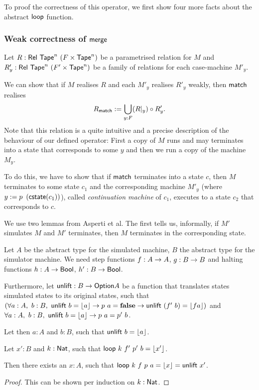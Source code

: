 \documentclass{psartcl}
\begin{document}
To proof the correctness of this operator, we first show four more facts about the abstract $\textsf{loop}$ function.

\subsubsection{Weak correctness of $\textsf{merge}$}

Let $R:\mathsf{Rel}~{\textsf{Tape}^{n}}~(F \times \textsf{Tape}^{n})$ be a parametrised relation for $M$ and $R'_y:\mathsf{Rel}~\textsf{Tape}^{n}~(F' \times \textsf{Tape}^{n})$ be a family
of relations for each case-machine $M'_y$.

We can show that if $M$ realises $R$ and each $M'_y$ realises $R'_y$ weakly, then $\textsf{match}$ realises
$$R_{\textsf{match}} := \bigcup_{y:F} (R |_{y}) \circ R'_y.$$
Note that this relation is a quite intuitive and a precise description of the behaviour of our defined operator:  First a copy of $M$ runs and may
terminates into a state that corresponds to some $y$ and then we run a copy of the machine $M_y$.

To do this, we have to show that if $\textsf{match}$ terminates into a state $c$, then $M$ terminates to some state $c_1$ and the corresponding machine
$M'_y$ (where $y := p~\left( \textsf{cstate}(c_1) \right)$), called \emph{continuation machine} of $c_1$, executes to a state $c_2$ that corresponds to
$c$.

We use two lemmas from Asperti et al.  The first tells us, informally, if $M'$ simulates $M$ and $M'$ terminates, then $M$ terminates in the
corresponding state.

\begin{lemma}
  \label{lem:loop-unlift}
  Let $A$ be the abstract type for the simulated machine, $B$ the abstract type for the simulator machine.
  We need step functions $f : A \rightarrow A$, $g : B \rightarrow B$ and halting functions $h : A \rightarrow \textsf{Bool}$, $h' : B \rightarrow \textsf{Bool}$.

  Furthermore, let $\textsf{unlift} : B \rightarrow \textsf{Option} A$ be a function that translates states simulated states to its original states, such that
  $(\forall a: A,~b: B,~\textsf{unlift}~b = \left\lfloor {a}\right\rfloor \rightarrow p~a = \mathbf{false} \rightarrow \textsf{unlift}~(f'~b) = \left\lfloor {f a}\right\rfloor)$
  and
  $\forall a: A,~b: B,~\textsf{unlift}~b = \left\lfloor {a}\right\rfloor \rightarrow p~a = p'~b$.

  Let then $a:A$ and $b:B$, such that $\textsf{unlift}~b = \left\lfloor {a}\right\rfloor$.

  Let $x':B$ and $k:\textsf{Nat}$, such that $\textsf{loop}~k~f'~p'~b = \left\lfloor {x'}\right\rfloor$.

  Then there exists an $x:A$, such that $\textsf{loop}~k~f~p~a = \left\lfloor {x}\right\rfloor = \textsf{unlift}~x'$.
\end{lemma}
\begin{proof}
  This can be shown per induction on $k:\textsf{Nat}$.
\end{proof}
\end{document}
